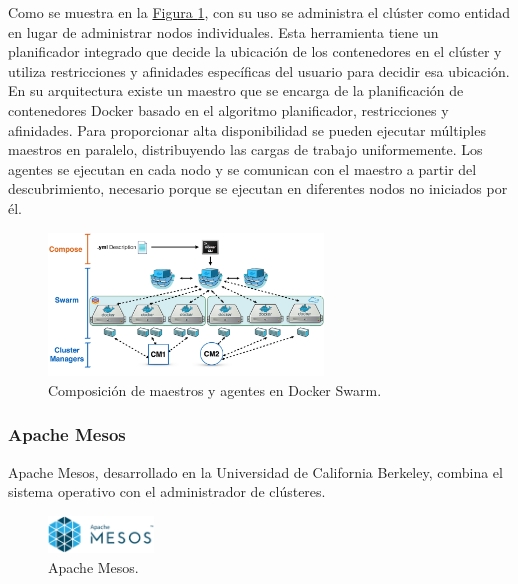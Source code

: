 
Como se muestra en la \hyperref[fig:dockermasterandagent]{Figura \ref{fig:dockermasterandagent}}, con su uso se administra el clúster como entidad en lugar de administrar nodos individuales. Esta herramienta tiene un planificador integrado que decide la ubicación de los contenedores en el clúster y utiliza restricciones y afinidades específicas del usuario para decidir esa ubicación. En su arquitectura existe un maestro que se encarga de la planificación de contenedores Docker basado en el algoritmo planificador, restricciones y afinidades. Para proporcionar alta disponibilidad se pueden ejecutar múltiples maestros en paralelo, distribuyendo las cargas de trabajo uniformemente. Los agentes se ejecutan en cada nodo y se comunican con el maestro a partir del descubrimiento, necesario porque se ejecutan en diferentes nodos no iniciados por él.

\begin{figure}[H]
\centering
\includegraphics[width=0.65\textwidth]{images/figures/dockermasterandagent.png}
\caption{Composición de maestros y agentes en Docker Swarm.\footnotemark \label{fig:dockermasterandagent}}
\end{figure}

	
\subsubsection{Apache Mesos}

Apache Mesos, desarrollado en la Universidad de California Berkeley, combina el sistema operativo con el administrador de clústeres.

\begin{figure}[H]
\centering
\includegraphics[width=0.25\textwidth]{images/figures/apachemesoslogo.png}
\caption{Apache Mesos.\footnotemark}
\end{figure}

